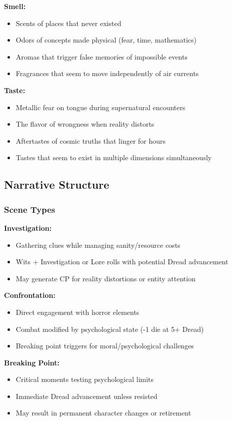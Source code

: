\documentclass[11pt]{article}
\begin{document}
\textbf{Smell:}
\begin{itemize}
\item Scents of places that never existed
\item Odors of concepts made physical (fear, time, mathematics)
\item Aromas that trigger false memories of impossible events
\item Fragrances that seem to move independently of air currents
\end{itemize}

\textbf{Taste:}
\begin{itemize}
\item Metallic fear on tongue during supernatural encounters
\item The flavor of wrongness when reality distorts
\item Aftertastes of cosmic truths that linger for hours
\item Tastes that seem to exist in multiple dimensions simultaneously
\end{itemize}

\subsection{Narrative Structure}

\subsubsection{Scene Types}

\textbf{Investigation:}
\begin{itemize}
\item Gathering clues while managing sanity/resource costs
\item Wits + Investigation or Lore rolls with potential Dread advancement
\item May generate CP for reality distortions or entity attention
\end{itemize}

\textbf{Confrontation:}
\begin{itemize}
\item Direct engagement with horror elements
\item Combat modified by psychological state (-1 die at 5+ Dread)
\item Breaking point triggers for moral/psychological challenges
\end{itemize}

\textbf{Breaking Point:}
\begin{itemize}
\item Critical moments testing psychological limits
\item Immediate Dread advancement unless resisted
\item May result in permanent character changes or retirement
\end{itemize}
\end{document}
